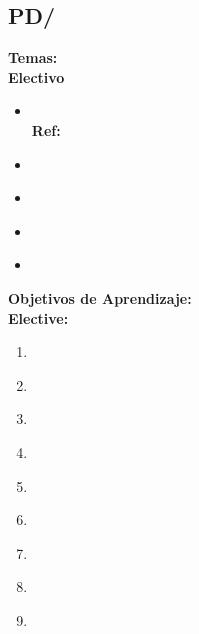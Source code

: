 \subsection{PD/\PDDistributedSystems}\label{sec:BOK:PDDistributedSystems}
\noindent \textbf{Temas:}\\
\noindent \textbf{Electivo}
\begin{itemize}
	\item \PDDistributedSystemsTopicFaults\xspace \\ \textbf{Ref:} \label{sec:BOK:PDDistributedSystemsTopicFaults}
	\item \PDDistributedSystemsTopicDistributed\label{sec:BOK:PDDistributedSystemsTopicDistributed}
	\item \PDDistributedSystemsTopicDistributedSystem\label{sec:BOK:PDDistributedSystemsTopicDistributedSystem}
	\item \PDDistributedSystemsTopicDistributedService\label{sec:BOK:PDDistributedSystemsTopicDistributedService}
	\item \PDDistributedSystemsTopicCore\label{sec:BOK:PDDistributedSystemsTopicCore}
\end{itemize}


\noindent \textbf{Objetivos de Aprendizaje:}\\
\noindent \textbf{Elective:}
\begin{enumerate}
	\setcounter{enumi}{0}
	\item \PDDistributedSystemsLODistinguishNetwork\xspace[\PDDistributedSystemsLODistinguishNetworkLevel]\label{sec:BOK:PDDistributedSystemsLODistinguishNetwork}
	\item \PDDistributedSystemsLOExplainWhySuch\xspace[\PDDistributedSystemsLOExplainWhySuchLevel]\label{sec:BOK:PDDistributedSystemsLOExplainWhySuch}
	\item \PDDistributedSystemsLOWriteAPerforms\xspace[\PDDistributedSystemsLOWriteAPerformsLevel]\label{sec:BOK:PDDistributedSystemsLOWriteAPerforms}
	\item \PDDistributedSystemsLOMeasure\xspace[\PDDistributedSystemsLOMeasureLevel]\label{sec:BOK:PDDistributedSystemsLOMeasure}
	\item \PDDistributedSystemsLOExplainWhySystem\xspace[\PDDistributedSystemsLOExplainWhySystemLevel]\label{sec:BOK:PDDistributedSystemsLOExplainWhySystem}
	\item \PDDistributedSystemsLOImplementAForSpell\xspace[\PDDistributedSystemsLOImplementAForSpellLevel]\label{sec:BOK:PDDistributedSystemsLOImplementAForSpell}
	\item \PDDistributedSystemsLOExplainTheOverhead\xspace[\PDDistributedSystemsLOExplainTheOverheadLevel]\label{sec:BOK:PDDistributedSystemsLOExplainTheOverhead}
	\item \PDDistributedSystemsLODescribeTheAssociated\xspace[\PDDistributedSystemsLODescribeTheAssociatedLevel]\label{sec:BOK:PDDistributedSystemsLODescribeTheAssociated}
	\item \PDDistributedSystemsLOGiveExamplesFor\xspace[\PDDistributedSystemsLOGiveExamplesForLevel]\label{sec:BOK:PDDistributedSystemsLOGiveExamplesFor}
\end{enumerate}


